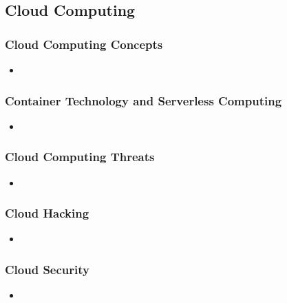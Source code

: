\subsection{Cloud Computing}
\subsubsection{Cloud Computing Concepts}
\begin{itemize}
    \item 
\end{itemize}
\subsubsection{Container Technology and Serverless Computing}
\begin{itemize}
    \item 
\end{itemize}
\subsubsection{Cloud Computing Threats}
\begin{itemize}
    \item 
\end{itemize}
\subsubsection{Cloud Hacking}
\begin{itemize}
    \item 
\end{itemize}
\subsubsection{Cloud Security}
\begin{itemize}
    \item 
\end{itemize}

